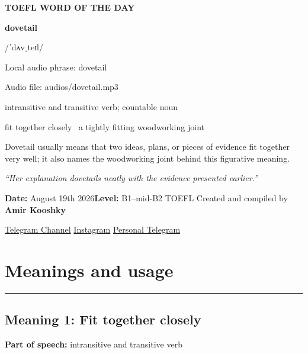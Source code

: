\documentclass[11pt]{article}
\newcommand{\sectionrule}{\par\vspace{-0.5em}\noindent\textcolor{Accent}{\rule{\linewidth}{0.6pt}}\par}
\begin{document}
\begin{center}
{\sffamily\bfseries\color{Accent} TOEFL WORD OF THE DAY\par}
\vspace{8mm}
{\fontsize{42}{48}\selectfont\bfseries dovetail\par}
\vspace{2mm}
{\Large\sffamily\color{Accent} /ˈdʌvˌteɪl/\par}
\vspace{2mm}
{\small\sffamily Local audio phrase: dovetail\par}
{\small\sffamily Audio file: audios/dovetail.mp3\par}
\vspace{2mm}
{\large\sffamily\color{Muted} intransitive and transitive verb; countable noun\par}
\vspace{5mm}
{\sffamily fit together closely \textbullet\ a tightly fitting woodworking joint\par}
\vspace{6mm}
{\large Dovetail usually means that two ideas, plans, or pieces of evidence fit together very well; it also names the woodworking joint behind this figurative meaning.\par}
\vspace{6mm}
\begin{minipage}{0.84\textwidth}
\itshape “Her explanation dovetails neatly with the evidence presented earlier.”
\end{minipage}\par
\vspace{10mm}
\textbf{Date:} August 19th 2026\quad\textbullet\quad \textbf{Level:} B1--mid-B2 TOEFL
\vfill
Created and compiled by \textbf{Amir Kooshky}\par
\vspace{2mm}
\href{https://t.me/KooshkyTOEFL}{Telegram Channel}\quad\textbullet\quad
\href{https://www.instagram.com/kooshkytoefl}{Instagram}\quad\textbullet\quad
\href{https://t.me/KooshkyTOEFL\_pv}{Personal Telegram}
\end{center}
\newpage
\tableofcontents
\newpage

\section{Meanings and usage}
\sectionrule
\subsection{Meaning 1: Fit together closely}
\textbf{Part of speech:} intransitive and transitive verb
\end{document}
